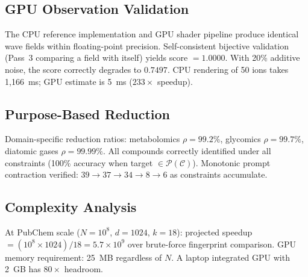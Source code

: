 \documentclass[11pt,twocolumn,a4paper]{article}
\theoremstyle{definition}
\theoremstyle{remark}
\newcommand{\Purpose}{\mathcal{P}}
\newcommand{\Context}{\mathcal{C}}
\begin{document}
\subsection{GPU Observation Validation}

The CPU reference implementation and GPU shader pipeline produce identical wave fields within floating-point precision. Self-consistent bijective validation (Pass~3 comparing a field with itself) yields score $= 1.0000$. With 20\% additive noise, the score correctly degrades to $0.7497$. CPU rendering of 50 ions takes 1,166~ms; GPU estimate is 5~ms ($233\times$ speedup).

\subsection{Purpose-Based Reduction}

Domain-specific reduction ratios: metabolomics $\rho = 99.2\%$, glycomics $\rho = 99.7\%$, diatomic gases $\rho = 99.99\%$. All compounds correctly identified under all constraints (100\% accuracy when target $\in \Purpose(\Context)$). Monotonic prompt contraction verified: $39 \to 37 \to 34 \to 8 \to 6$ as constraints accumulate.

\subsection{Complexity Analysis}

At PubChem scale ($N = 10^8$, $d = 1024$, $k = 18$): projected speedup $= (10^8 \times 1024)/18 = 5.7 \times 10^9$ over brute-force fingerprint comparison. GPU memory requirement: 25~MB regardless of $N$. A laptop integrated GPU with 2~GB has $80\times$ headroom.
\end{document}
